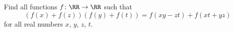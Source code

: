 Find all functions $f \colon \RR \to \RR$ such that
\[ \left(f(x)+f(z)\right)\left(f(y)+f(t)\right)
  = f(xy-zt)+f(xt+yz) \]
for all real numbers $x$, $y$, $z$, $t$.